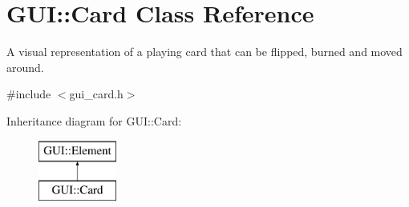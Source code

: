 \hypertarget{classGUI_1_1Card}{\section{G\-U\-I\-:\-:Card Class Reference}
\label{classGUI_1_1Card}
}


A visual representation of a playing card that can be flipped, burned and moved around.  




{\ttfamily \#include $<$gui\-\_\-card.\-h$>$}

Inheritance diagram for G\-U\-I\-:\-:Card\-:\begin{figure}[H]
\begin{center}
\leavevmode
\includegraphics[height=2.000000cm]{classGUI_1_1Card}
\end{center}
\end{figure}
